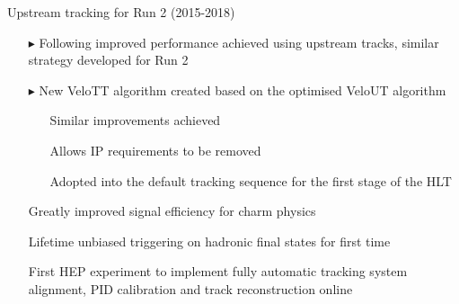 \documentclass[aspectratio=1610]{beamer}
\begin{document}
\begin{frame}{Upstream tracking for \lhcb Run 2 (2015-2018)}

\begin{itemize}
  \item[$\blacktriangleright$] Following improved performance achieved using upstream tracks, similar strategy developed for Run 2
  \item[$\blacktriangleright$]   New VeloTT algorithm created based on the optimised VeloUT algorithm
  \begin{itemize}
    \item[\ding{80}] Similar improvements achieved
    \item[\ding{80}] Allows IP requirements to be removed
    \item[\ding{80}] Adopted into the default tracking sequence for the first stage of the HLT
  \end{itemize}
\end{itemize}

\begin{itemize}
  \item[\ding{80}] Greatly improved signal efficiency for charm physics
  \item[\ding{80}] Lifetime unbiased triggering on hadronic final states for first time
\end{itemize}

\begin{itemize}
\item[\ding{80}] First HEP experiment to implement fully automatic tracking system alignment, PID calibration and track reconstruction online
\end{itemize}

\end{frame}

{
 
 \begin{frame}[plain]
 \vspace{8.75cm}
 \hspace{-0.75cm}
 \huge\color{anti-flashwhite}{The decay \BdToKpimm}
 \end{frame}
}
\end{document}
